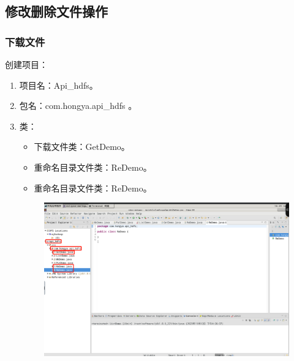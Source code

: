 \documentclass {article}
\begin{document}
		\subsection{修改删除文件操作}
			\subsubsection{下载文件}
				创建项目：
				\begin{enumerate}
					\item 项目名：Api\_hdfs。
					\item 包名：com.hongya.api\_hdfs 。
					\item 类：
					\begin{itemize}
						\item 下载文件类：GetDemo。
						\item 重命名目录文件类：ReDemo。
						\item 重命名目录文件类：ReDemo。
					\end{itemize}
					\begin{figure}[H]
						\centering
						\includegraphics[width=4.5in]{figures/fig21.png}
					\end{figure}
				\end{enumerate}
			
\end{document}
